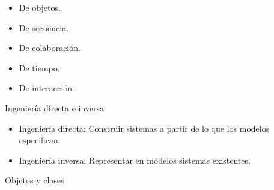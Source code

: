 \documentclass[12pt, twoside, openright]{report} %
\begin{document}
\begin{itemize}
\begin{itemize}
\begin{figure}[H]
		\end{figure}
      \item
        De objetos.
      \item
        De secuencia.
      \item
        De colaboración.
      \item
        De tiempo.
      \item
        De interacción.
      \end{itemize}
    \end{itemize}

	Ingeniería directa e inversa
\vspace{-0.5cm}
    \begin{itemize}
    
    \item
      Ingeniería directa: Construir sistemas a partir de lo que los
      modelos especifican.
    \item
      Ingeniería inversa: Representar en modelos sistemas existentes.
    \end{itemize}

	Objetos y clases
	\vspace{-0.5cm}
\end{document}
